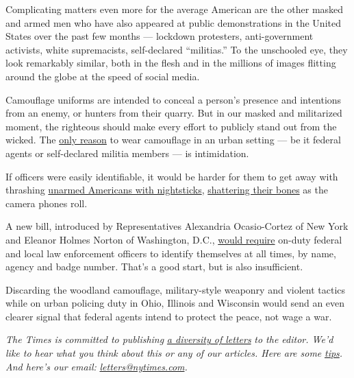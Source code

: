 Complicating matters even more for the average American are the other
masked and armed men who have also appeared at public demonstrations in
the United States over the past few months --- lockdown protesters,
anti-government activists, white supremacists, self-declared
``militias.'' To the unschooled eye, they look remarkably similar, both
in the flesh and in the millions of images flitting around the globe at
the speed of social media.

Camouflage uniforms are intended to conceal a person's presence and
intentions from an enemy, or hunters from their quarry. But in our
masked and militarized moment, the righteous should make every effort to
publicly stand out from the wicked. The
\href{https://taskandpurpose.com/pentagon-run-down/police-military-uniforms-undermines-democracy}{only
reason} to wear camouflage in an urban setting --- be it federal agents
or self-declared militia members --- is intimidation.

If officers were easily identifiable, it would be harder for them to get
away with thrashing
\href{https://taskandpurpose.com/news/navy-veteran-christopher-david-interview-portland}{unarmed
Americans with nightsticks},
\href{https://www.washingtonpost.com/nation/2020/07/20/christopher-david-portland-protest-video/}{shattering
their bones} as the camera phones roll.

A new bill, introduced by Representatives Alexandria Ocasio-Cortez of
New York and Eleanor Holmes Norton of Washington, D.C.,
\href{https://ocasio-cortez.house.gov/sites/ocasio-cortez.house.gov/files/documents/OCASNY_076_xml.pdf}{would
require} on-duty federal and local law enforcement officers to identify
themselves at all times, by name, agency and badge number. That's a good
start, but is also insufficient.

Discarding the woodland camouflage, military-style weaponry and violent
tactics while on urban policing duty in Ohio, Illinois and Wisconsin
would send an even clearer signal that federal agents intend to protect
the peace, not wage a war.

\emph{The Times is committed to publishing}
\href{https://www.nytimes.com/2019/01/31/opinion/letters/letters-to-editor-new-york-times-women.html}{\emph{a
diversity of letters}} \emph{to the editor. We'd like to hear what you
think about this or any of our articles. Here are some}
\href{https://help.nytimes.com/hc/en-us/articles/115014925288-How-to-submit-a-letter-to-the-editor}{\emph{tips}}\emph{.
And here's our email:}
\href{mailto:letters@nytimes.com}{\emph{letters@nytimes.com}}\emph{.}

